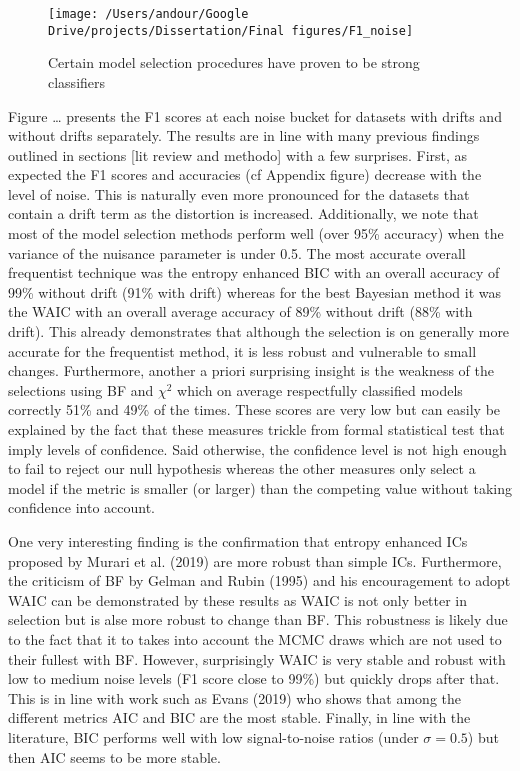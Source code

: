 \documentclass[]{article}
\begin{document}
\begin{figure}

{\centering \texttt{[image: /Users/andour/Google Drive/projects/Dissertation/Final figures/F1\_noise]} 

}

\caption{Certain model selection procedures have proven to be strong classifiers}\label{fig:unnamed-chunk-4}
\end{figure}

Figure \ldots{} presents the F1 scores at each noise bucket for datasets
with drifts and without drifts separately. The results are in line with
many previous findings outlined in sections {[}lit review and methodo{]}
with a few surprises. First, as expected the F1 scores and accuracies
(cf Appendix figure) decrease with the level of noise. This is naturally
even more pronounced for the datasets that contain a drift term as the
distortion is increased. Additionally, we note that most of the model
selection methods perform well (over 95\% accuracy) when the variance of
the nuisance parameter is under 0.5. The most accurate overall
frequentist technique was the entropy enhanced BIC with an overall
accuracy of 99\% without drift (91\% with drift) whereas for the best
Bayesian method it was the WAIC with an overall average accuracy of 89\%
without drift (88\% with drift). This already demonstrates that although
the selection is on generally more accurate for the frequentist method,
it is less robust and vulnerable to small changes. Furthermore, another
a priori surprising insight is the weakness of the selections using BF
and \(\chi^2\) which on average respectfully classified models correctly
51\% and 49\% of the times. These scores are very low but can easily be
explained by the fact that these measures trickle from formal
statistical test that imply levels of confidence. Said otherwise, the
confidence level is not high enough to fail to reject our null
hypothesis whereas the other measures only select a model if the metric
is smaller (or larger) than the competing value without taking
confidence into account.

One very interesting finding is the confirmation that entropy enhanced
ICs proposed by Murari et al. (2019) are more robust than simple ICs.
Furthermore, the criticism of BF by Gelman and Rubin (1995) and his
encouragement to adopt WAIC can be demonstrated by these results as WAIC
is not only better in selection but is alse more robust to change than
BF. This robustness is likely due to the fact that it to takes into
account the MCMC draws which are not used to their fullest with BF.
However, surprisingly WAIC is very stable and robust with low to medium
noise levels (F1 score close to 99\%) but quickly drops after that. This
is in line with work such as Evans (2019) who shows that among the
different metrics AIC and BIC are the most stable. Finally, in line with
the literature, BIC performs well with low signal-to-noise ratios (under
\(\sigma = 0.5\)) but then AIC seems to be more stable.
\end{document}
